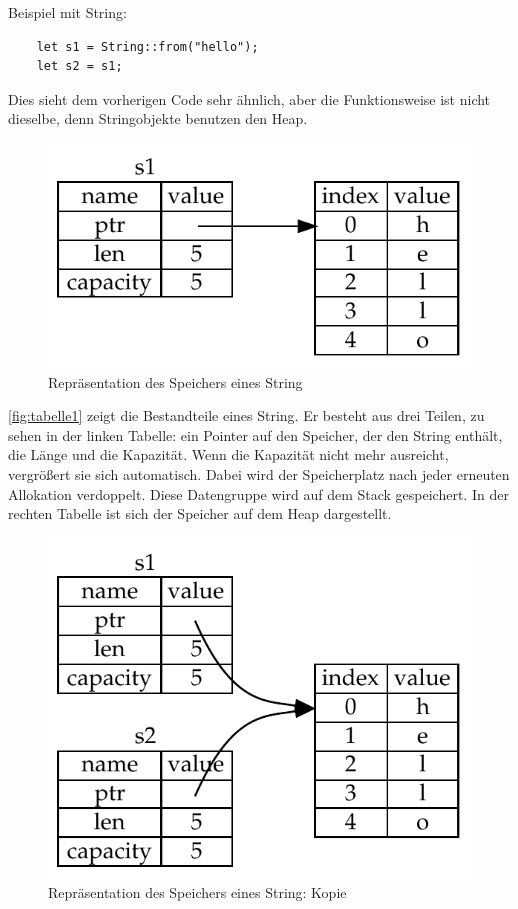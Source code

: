 \newpage

Beispiel mit String:

\begin{lstlisting}
    let s1 = String::from("hello");
    let s2 = s1;
\end{lstlisting}

Dies sieht dem vorherigen Code sehr ähnlich, aber die Funktionsweise ist nicht dieselbe, denn Stringobjekte benutzen den Heap.

\begin{figure}[htbp]
    \centering
    \includegraphics[scale=0.9]{Programmierung/Tabelle1.pdf}
    \caption{Repräsentation des Speichers eines String}
    \label{fig:tabelle1}
\end{figure}

\autoref{fig:tabelle1} zeigt die Bestandteile eines String. Er besteht aus drei Teilen, zu sehen in der linken Tabelle: ein Pointer auf den Speicher, der den String enthält, die Länge und die Kapazität. Wenn die Kapazität nicht mehr ausreicht, vergrößert sie sich automatisch. Dabei wird der Speicherplatz nach jeder erneuten Allokation verdoppelt. Diese Datengruppe wird auf dem Stack gespeichert. In der rechten Tabelle ist sich der Speicher auf dem Heap dargestellt.

\begin{figure}[htbp]
    \centering
    \includegraphics[scale=0.9]{Programmierung/Tabelle2.pdf}
    \caption{Repräsentation des Speichers eines String: Kopie}
    \label{fig:tabelle2}
\end{figure}

